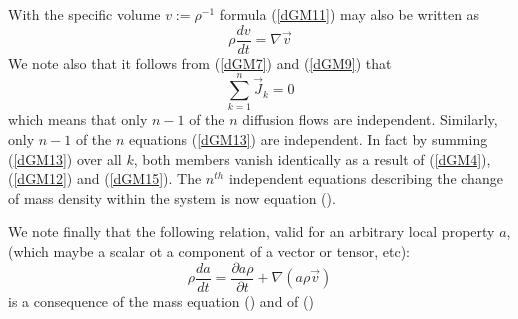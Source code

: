 With the specific volume $v:=\rho^{-1}$ formula (\ref{dGM11}) may also be written as
\begin{equation}
\rho \frac{dv}{dt} = \nabla \vec{v}
\end{equation}
We note also that it follows from (\ref{dGM7}) and (\ref{dGM9}) that 
\begin{equation}
\sum_{k=1}^n \vec{J}_k =0 
\label{dGM15}
\end{equation}
which means that only $n-1$ of the $n$ diffusion flows are independent.
Similarly, only $n-1$ of the $n$ equations (\ref{dGM13}) are independent. In fact by summing (\ref{dGM13}) over all $k$, both members vanish identically as a result of (\ref{dGM4}), (\ref{dGM12}) and (\ref{dGM15}). The $n^{th}$ independent equations describing the change of mass density within the system is now equation (\label{dGM14}).

We note finally that the following relation, valid for an arbitrary local property $a$, (which maybe a scalar ot a component of a vector or tensor, etc):
\begin{equation}
\rho \frac{da}{dt} = \frac{\partial a\rho}{\partial t} + \nabla ( a \rho \vec{v})
\label{dGM16}
\end{equation}
is a consequence of the mass equation (\label{dGM5}) and of (\label{dGM8})